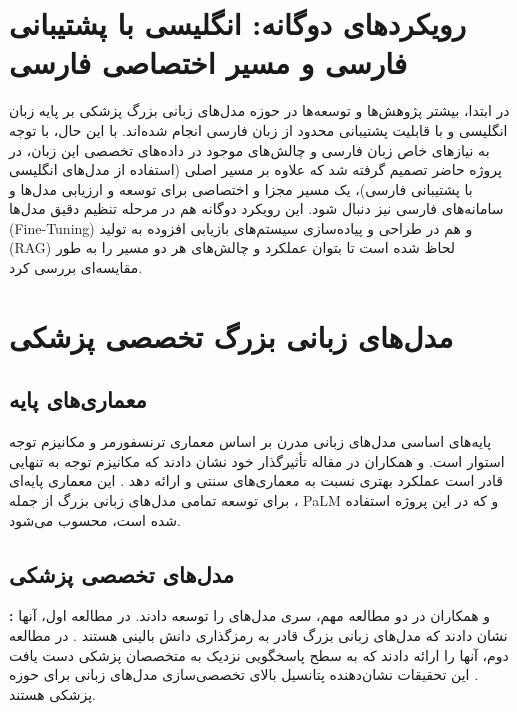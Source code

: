 \documentclass[11pt, a4paper, oneside]{book}
\begin{document}
	\section{رویکردهای دوگانه: انگلیسی با پشتیبانی فارسی و مسیر اختصاصی فارسی}

	در ابتدا، بیشتر پژوهش‌ها و توسعه‌ها در حوزه مدل‌های زبانی بزرگ پزشکی بر پایه زبان انگلیسی و با قابلیت پشتیبانی محدود از زبان فارسی انجام شده‌اند. با این حال، با توجه به نیازهای خاص زبان فارسی و چالش‌های موجود در داده‌های تخصصی این زبان، در پروژه حاضر تصمیم گرفته شد که علاوه بر مسیر اصلی (استفاده از مدل‌های انگلیسی با پشتیبانی فارسی)، یک مسیر مجزا و اختصاصی برای توسعه و ارزیابی مدل‌ها و سامانه‌های فارسی نیز دنبال شود. این رویکرد دوگانه هم در مرحله تنظیم دقیق مدل‌ها (Fine-Tuning) و هم در طراحی و پیاده‌سازی سیستم‌های بازیابی افزوده به تولید (RAG) لحاظ شده است تا بتوان عملکرد و چالش‌های هر دو مسیر را به طور مقایسه‌ای بررسی کرد.

	\section{مدل‌های زبانی بزرگ تخصصی پزشکی}

	\subsection{معماری‌های پایه}

	پایه‌های اساسی مدل‌های زبانی مدرن بر اساس معماری ترنسفورمر و مکانیزم توجه استوار است.  و همکاران در مقاله تأثیرگذار خود نشان دادند که مکانیزم توجه به تنهایی قادر است عملکرد بهتری نسبت به معماری‌های سنتی  و  ارائه دهد \cite{vaswani_attention_2023}. این معماری پایه‌ای برای توسعه تمامی مدل‌های زبانی بزرگ از جمله ، PaLM و  که در این پروژه استفاده شده است، محسوب می‌شود.

	\subsection{مدل‌های تخصصی پزشکی}

	\textbf{:}  و همکاران در دو مطالعه مهم، سری مدل‌های  را توسعه دادند. در مطالعه اول، آنها نشان دادند که مدل‌های زبانی بزرگ قادر به رمزگذاری دانش بالینی هستند \cite{singhal_large_2022}. در مطالعه دوم، آنها  را ارائه دادند که به سطح پاسخگویی نزدیک به متخصصان پزشکی دست یافت \cite{singhal_towards_2023}. این تحقیقات نشان‌دهنده پتانسیل بالای تخصصی‌سازی مدل‌های زبانی برای حوزه پزشکی هستند.
\end{document}
